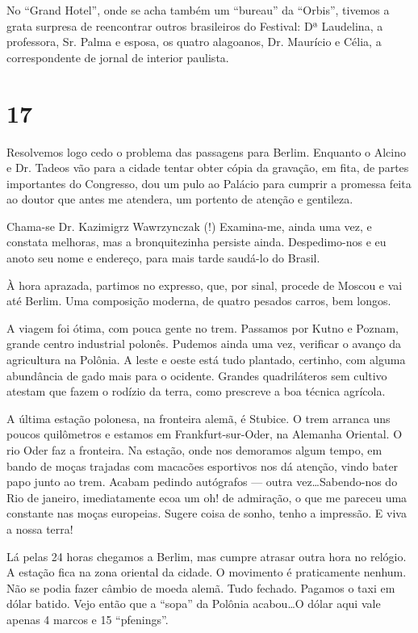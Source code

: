 No ``Grand Hotel'', onde se acha também um ``bureau'' da ``Orbis'', tivemos a grata surpresa de reencontrar outros brasileiros do Festival: Dª Laudelina, a professora, Sr. Palma e esposa, os quatro alagoanos, Dr. Maurício e Célia, a correspondente de jornal de interior paulista.

\section*{17 \adfflatleafright {}}
Resolvemos logo cedo o problema das passagens para Berlim. Enquanto o Alcino e Dr. Tadeos vão para a cidade tentar obter cópia da gravação, em fita, de partes importantes do Congresso, dou um pulo ao Palácio para cumprir a promessa feita ao doutor que antes me atendera, um portento de atenção e gentileza.

Chama-se Dr. Kazimigrz Wawrzynczak (!) Examina-me, ainda uma vez, e constata melhoras, mas a bronquitezinha persiste ainda. Despedimo-nos e eu anoto seu nome e endereço, para mais tarde saudá-lo do Brasil.

À hora aprazada, partimos no expresso, que, por sinal, procede de Moscou e vai até Berlim. Uma composição moderna, de quatro pesados carros, bem longos.

A viagem foi ótima, com pouca gente no trem. Passamos por Kutno e Poznam, grande centro industrial polonês. Pudemos ainda uma vez, verificar o avanço da agricultura na Polônia. A leste e oeste está tudo plantado, certinho, com alguma abundância de gado mais para o ocidente. Grandes quadriláteros sem cultivo atestam que fazem o rodízio da terra, como prescreve a boa técnica agrícola.

A última estação polonesa, na fronteira alemã, é Stubice. O trem arranca uns poucos quilômetros e estamos em Frankfurt-sur-Oder, na Alemanha Oriental. O rio Oder faz a fronteira. Na estação, onde nos demoramos algum tempo, em bando de moças trajadas com macacões esportivos nos dá atenção, vindo bater papo junto ao trem. Acabam pedindo autógrafos --- outra vez\ldots Sabendo-nos do Rio de janeiro, imediatamente ecoa um oh! de admiração, o que me pareceu uma constante nas moças europeias. Sugere coisa de sonho, tenho a impressão. E viva a nossa terra!

Lá pelas 24 horas chegamos a Berlim, mas cumpre atrasar outra hora no relógio. A estação fica na zona oriental da cidade. O movimento é praticamente nenhum. Não se podia fazer câmbio de moeda alemã. Tudo fechado. Pagamos o taxi em dólar batido. Vejo então que a ``sopa'' da Polônia acabou\ldots O dólar aqui vale apenas 4 marcos e 15 ``pfenings''.

